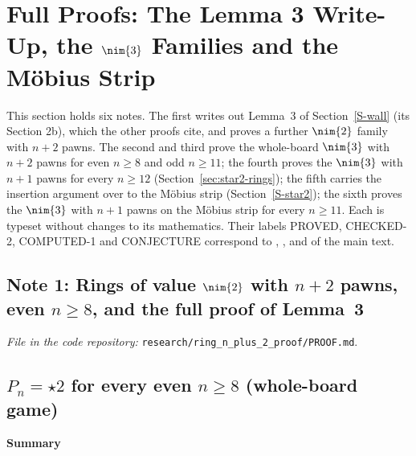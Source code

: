 \section{Full Proofs: The Lemma 3 Write-Up, the \texorpdfstring{$\nim{3}$}{*3} Families and the M\"obius Strip}\label{S-star3}
This section holds six notes. The first writes out Lemma~3 of Section~\ref{S-wall} (its Section 2b), which the other proofs cite, and proves a further $\nim{2}$ family with $n+2$ pawns. The second and third prove the whole-board $\nim{3}$ with $n+2$ pawns for even $n\ge8$ and odd $n\ge11$; the fourth proves the $\nim{3}$ with $n+1$ pawns for every $n\ge12$ (Section~\ref{sec:star2-rings}); the fifth carries the insertion argument over to the M\"obius strip (Section~\ref{S-star2}); the sixth proves the $\nim{3}$ with $n+1$ pawns on the M\"obius strip for every $n\ge11$. Each is typeset without changes to its mathematics. Their labels PROVED, CHECKED-2, COMPUTED-1 and CONJECTURE correspond to , ,  and  of the main text.
\subsection{Note 1: Rings of value $\nim{2}$ with $n+2$ pawns, even $n\ge8$, and the full proof of Lemma~3}

\noindent\emph{File in the code repository:} \texttt{research/ring\_n\_plus\_2\_proof/PROOF.md}.\par


\subsection*{$P_n=\star2$ for every even $n\ge 8$ (whole-board game)}
\textbf{Summary}

